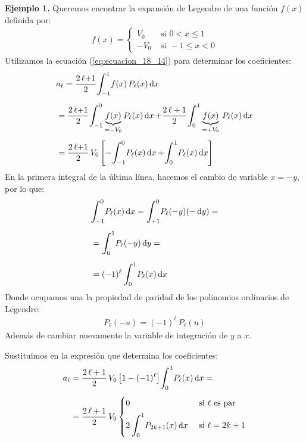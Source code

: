 \documentclass[12pt]{article}
\def\scaleint#1{\vcenter{\hbox{\scaleto[3ex]{\displaystyle\int}{#1}}}}
\def\bs{\mkern-12mu}
\numberwithin{equation}{section}
\begin{document}
\textbf{Ejemplo 1.} Queremos encontrar la expansión de Legendre de una función $f (x)$ definida por:
\begin{align*}
f (x) = \begin{cases}
V_{0} & \mbox{ si } 0 < x \leq 1 \\[0.5em]
- V_{0} & \mbox{ si } -1 \leq x < 0
\end{cases}
\end{align*}
Utilizamos la ecuación (\ref{eq:ecuacion_18_14}) para determinar los coeficientes:
\begin{eqnarray*}
\begin{aligned}
&a_{\ell} = \dfrac{2 \, \ell {+} 1}{2} \scaleint{6ex}_{\bs -1}^{1} f (x) \, P_{\ell} (x) \dd{x} \\[0.5em] 
&= \dfrac{2 \, \ell {+} 1}{2} \scaleint{6ex}_{\bs -1}^{0} \underbrace{f(x)}_{=-V_0}  P_{\ell} (x) \dd{x} {+} \dfrac{2 \, \ell + 1}{2} \scaleint{6ex}_{\bs 0}^{1} \underbrace{f (x)}_{=+V_0} \, P_{\ell} (x) \dd{x} \\[0.5em] 
&= \dfrac{2 \, \ell {+} 1}{2} \, V_{0} \left[ - \scaleint{6ex}_{\bs -1}^{0} P_{\ell} (x) \dd{x} {+} \scaleint{6ex}_{\bs 0}^{1} P_{\ell} (x) \dd{x} \right]
\end{aligned}
\end{eqnarray*}
En la primera integral de la última línea, hacemos el cambio de variable $x = -y$, por lo que:
\begin{eqnarray*}
\begin{aligned}
&\scaleint{6ex}_{\bs -1}^{0} P_{\ell} (x) \dd{x} = \scaleint{6ex}_{\bs +1}^{0} P_{\ell} (-y) (-\dd{y}) = \\[0.5em] 
&= \scaleint{6ex}_{\bs 0}^{1} P_{\ell} (-y) \dd{y} = \\[0.5em] 
&= (-1)^{\ell} \, \scaleint{6ex}_{\bs 0}^{1} P_{\ell} (x) \dd{x}
\end{aligned}
\end{eqnarray*}
Donde ocupamos una la propiedad de paridad de los polinomios ordinarios de Legendre:
\begin{align*}
P_{\ell} (-u) = (-1)^{\ell} \, P_{\ell} (u)
\end{align*}
Además de cambiar nuevamente la variable de integración de $y$ a $x$.
\par
Sustituimos en la expresión que determina los coeficientes:
\begin{align*}
a_{\ell} &= \dfrac{2 \, \ell + 1}{2} \, V_{0} \,  \big[ 1 - (-1)^{\ell} \big] \scaleint{6ex}_{\bs 0}^{1} P_{\ell} (x) \dd{x} = \\[0.5em]
&= \dfrac{2 \, \ell + 1}{2} \, V_{0} \begin{cases}
0 & \mbox{ si } \ell \mbox{ es par} \\[0.5em]
2 \, \displaystyle \scaleint{6ex}_{\bs 0}^{1} P_{2k+1} (x) \dd{x} & \mbox{ si } \ell = 2 k + 1 
\end{cases}
\end{align*}
\end{document}
